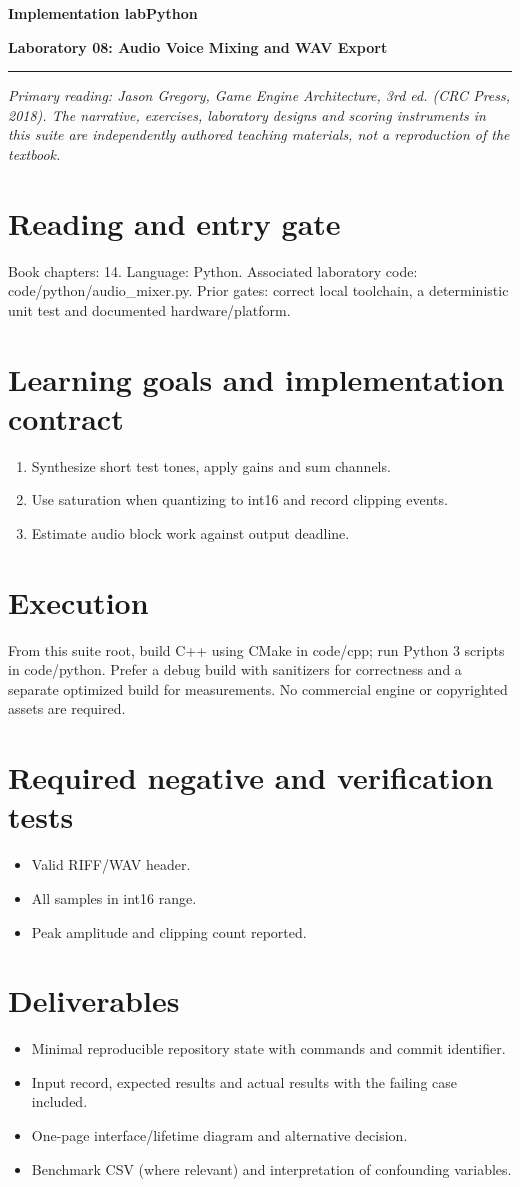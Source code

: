 \documentclass[11pt,letterpaper]{article}
\newcommand{\DocType}{Reference}
\newcommand{\SuiteHeading}[3]{%
\renewcommand{\DocType}{#2}%
{\small\bfseries\sffamily\color{EngineTeal}#2\hfill #3}\par\vspace{6pt}
{\LARGE\bfseries\color{EngineBlue}#1}\par\vspace{4pt}
{\color{EngineTeal}\rule{\linewidth}{1pt}}\par\vspace{7pt}}
\newcommand{\SourceNote}{\footnotesize\textit{Primary reading: Jason Gregory, \emph{Game Engine Architecture}, 3rd ed. (CRC Press, 2018). The narrative, exercises, laboratory designs and scoring instruments in this suite are independently authored teaching materials, not a reproduction of the textbook.}\normalsize\par}
\begin{document}
\SuiteHeading{Laboratory 08: Audio Voice Mixing and WAV Export}{Implementation lab}{Python}
\SourceNote
\section{Reading and entry gate}
Book chapters: 14. Language: Python. Associated laboratory code: code/python/audio\_mixer.py. Prior gates: correct local toolchain, a deterministic unit test and documented hardware/platform.

\section{Learning goals and implementation contract}
\begin{enumerate}
\item Synthesize short test tones, apply gains and sum channels.
\item Use saturation when quantizing to int16 and record clipping events.
\item Estimate audio block work against output deadline.
\end{enumerate}
\section{Execution}
From this suite root, build C++ using CMake in code/cpp; run Python 3 scripts in code/python. Prefer a debug build with sanitizers for correctness and a separate optimized build for measurements. No commercial engine or copyrighted assets are required.

\section{Required negative and verification tests}
\begin{itemize}
\item Valid RIFF/WAV header.
\item All samples in int16 range.
\item Peak amplitude and clipping count reported.
\end{itemize}
\section{Deliverables}
\begin{itemize}
\item Minimal reproducible repository state with commands and commit identifier.
\item Input record, expected results and actual results with the failing case included.
\item One-page interface/lifetime diagram and alternative decision.
\item Benchmark CSV (where relevant) and interpretation of confounding variables.
\end{itemize}
\end{document}
